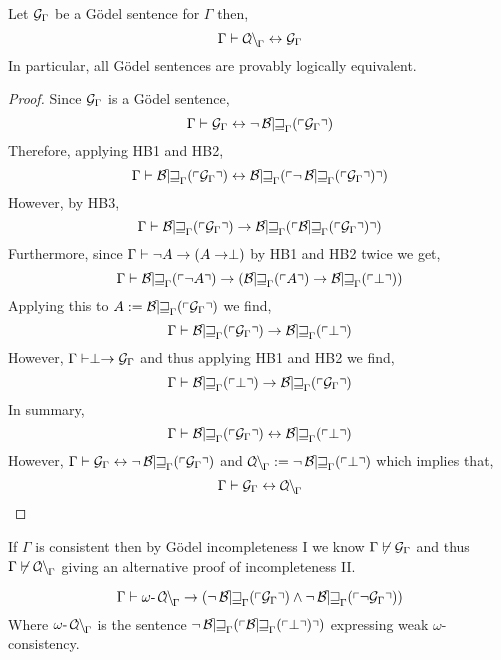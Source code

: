 \documentclass[12pt]{article}
\begin{document}
\begin{theorem}
Let $\G{\Gamma}$ be a G\"{o}del sentence for $\Gamma$ then,
\[ \Gamma \proves \Con_{\Gamma} \leftrightarrow \G{\Gamma} \]
In particular, all G\"{o}del sentences are provably logically equivalent. 
\end{theorem}

\begin{proof}
Since $\G{\Gamma}$ is a G\"{o}del sentence,
\[ \Gamma \proves \G{\Gamma} \leftrightarrow \neg \Thm{\G{\Gamma}} \]
Therefore, applying HB1 and HB2,
\[ \Gamma \proves \Thm{\G{\Gamma}} \leftrightarrow \Thm{\neg \Thm{\G{\Gamma}}} \]
However, by HB3,
\[ \Gamma \proves \Thm{\G{\Gamma}} \to \Thm{\Thm{\G{\Gamma}}} \] 
Furthermore, since $\Gamma \proves \neg A \to (A \to \perp)$  by HB1 and HB2 twice we get,
\[ \Gamma \proves \Thm{\neg A} \to (\Thm{A} \to \Thm{\perp}) \]
Applying this to $A := \Thm{\G{\Gamma}}$ we find,
\[ \Gamma \proves \Thm{\G{\Gamma}} \to \Thm{\perp} \]
However, $\Gamma \proves \perp \to \G{\Gamma}$ and thus applying HB1 and HB2 we find,
\[ \Gamma \proves \Thm{\perp} \to \Thm{\G{\Gamma}} \]
In summary,
\[ \Gamma \proves \Thm{\G{\Gamma}} \leftrightarrow \Thm{\perp} \]
However, $\Gamma \proves \G{\Gamma} \leftrightarrow \neg \Thm{\G{\Gamma}}$ and $\Con_{\Gamma} := \neg \Thm{\perp}$ which implies that,
\[ \Gamma \proves \G{\Gamma} \leftrightarrow \Con_{\Gamma} \]
\end{proof}

\begin{corollary}
If $\Gamma$ is consistent then by G\"{o}del incompleteness I we know $\Gamma \not\proves \G{\Gamma}$ and thus $\Gamma \not\proves \Con_{\Gamma}$ giving an alternative proof of incompleteness II. 
\end{corollary}

\newcommand{\oCon}{\omega\text{-}\Con_{\Gamma}}

\begin{theorem}
\[ \Gamma \proves \oCon \to (\neg \Thm{\G{\Gamma}} \wedge \neg \Thm{\neg \G{\Gamma}} ) \]
Where $\oCon$ is the sentence $\neg \Thm{\Thm{\perp}}$ expressing weak $\omega$-consistency. 
\end{theorem}
\end{document}
